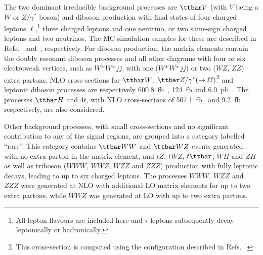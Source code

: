 The two dominant irreducible background processes are $\ttbar V$ (with $V$ being a $W$ or $Z/\gamma^*$ boson) 
and diboson production with final states of four charged leptons $\ell$,\footnote{All lepton flavours are included here and $\tau$
leptons subsequently decay leptonically or hadronically.} three charged leptons and one neutrino, or 
two same-sign charged leptons and two neutrinos. The MC simulation samples for these are described in 
Refs.~\cite{ATL-PHYS-PUB-2016-005} and~\cite{ATL-PHYS-PUB-2016-002}, 
respectively. For diboson production, the matrix elements contain the doubly resonant diboson processes and all other diagrams with four 
or six electroweak vertices, such as $W^\pm W^\pm jj$, with one ($W^\pm W^\pm jj$) or two ($WZ$, $ZZ$) extra partons.
NLO cross-sections for $\ttbar W$, $\ttbar Z/\gamma^*(\rightarrow \ell \ell)$\footnote{This cross-section is computed 
using the configuration described in Refs.~\cite{Alwall:2014hca,Frixione:2015zaa}.} 
and leptonic diboson processes are respectively 600.8~fb~\cite{YR4}, 124~fb and 
6.0~pb~\cite{ATL-PHYS-PUB-2016-002}. The processes $\ttbar H$ and 4$t$, with NLO cross-sections of 507.1~fb~\cite{YR4} and 
9.2~fb~\cite{Alwall:2014hca} respectively, are also considered.

Other background processes, with small cross-sections and no significant contribution to any of the signal regions, 
are grouped into a category labelled ``rare''. This category contains 
$\ttbar WW$ and $\ttbar WZ$ events generated with no extra parton in the matrix element, and $tZ$, $tWZ$, $t\ttbar$, $WH$ and $ZH$ as well as 
triboson ($WWW$, $WWZ$, $WZZ$ and $ZZZ$) production with fully leptonic decays, leading to up to six charged leptons. 
The processes $WWW$, $WZZ$ and $ZZZ$ were generated at NLO 
with additional LO matrix elements for up to two extra partons, 
while $WWZ$ was generated at LO with up to two extra partons. 
